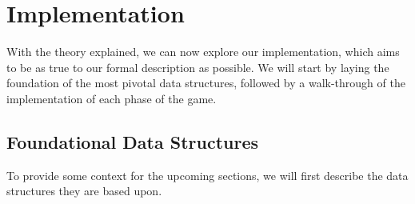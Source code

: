 \section{Implementation}\label{sec:implementation}
With the theory explained, we can now explore our implementation, which aims to
be as true to our formal description as possible. We will start by laying the foundation of
the most pivotal data structures, followed by a walk-through of the
implementation of each phase of the game.

\subsection{Foundational Data Structures}\label{sec:foundationalDataStructures}
To provide some context for the upcoming sections, we will first describe the
data structures they are based upon. 

